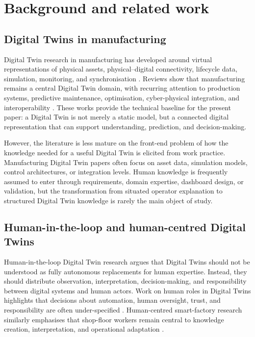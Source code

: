 \section{Background and related work}
\label{sec:background}

\subsection{Digital Twins in manufacturing}

Digital Twin research in manufacturing has developed around virtual representations of physical assets, physical--digital connectivity, lifecycle data, simulation, monitoring, and synchronisation \cite{grieves2017digital,kritzinger2018digital,tao2018digital,fuller2020digital}. Reviews show that manufacturing remains a central Digital Twin domain, with recurring attention to production systems, predictive maintenance, optimisation, cyber-physical integration, and interoperability \cite{negri2017review,semeraro2021digital}. These works provide the technical baseline for the present paper: a Digital Twin is not merely a static model, but a connected digital representation that can support understanding, prediction, and decision-making.

However, the literature is less mature on the front-end problem of how the knowledge needed for a useful Digital Twin is elicited from work practice. Manufacturing Digital Twin papers often focus on asset data, simulation models, control architectures, or integration levels. Human knowledge is frequently assumed to enter through requirements, domain expertise, dashboard design, or validation, but the transformation from situated operator explanation to structured Digital Twin knowledge is rarely the main object of study.

\subsection{Human-in-the-loop and human-centred Digital Twins}

Human-in-the-loop Digital Twin research argues that Digital Twins should not be understood as fully autonomous replacements for human expertise. Instead, they should distribute observation, interpretation, decision-making, and responsibility between digital systems and human actors. Work on human roles in Digital Twins highlights that decisions about automation, human oversight, trust, and responsibility are often under-specified \cite{agrawal2023humans,parasuraman2000levels,lee2004trust}. Human-centred smart-factory research similarly emphasises that shop-floor workers remain central to knowledge creation, interpretation, and operational adaptation \cite{longo2022ubiquitous}.

